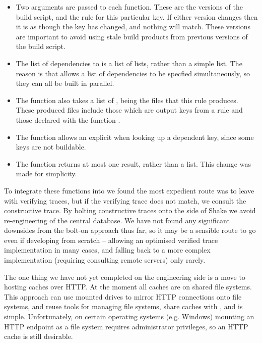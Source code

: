 \begin{itemize}
\item Two  arguments are passed to each function. These are
      the versions of the build script, and the rule for this particular key. If
      either version changes then it is as though the key has changed, and
      nothing will match. These versions are important to avoid using stale
      build products from previous versions of the build script.
\item The list of dependencies to  is a list of lists, rather than
      a simple list. The reason is that \Shake allows a list of dependencies to
      be specfied simultaneously, so they can all be built in parallel.
\item The  function also takes a list of , being the
      files that this rule produces. These produced files include those which
      are output keys from a rule and those declared with the function
      .
\item The  function allows an explicit  when looking
      up a dependent key, since some keys are not buildable.
\item The  function returns at most one result, rather than a
      list. This change was made for simplicity.
\end{itemize}

To integrate these functions into \Shake we found the most expedient route was
to leave \Shake with verifying traces, but if the verifying trace does not
match, we consult the constructive trace. By bolting constructive traces onto
the side of Shake we avoid re-engineering of the central database. We have not
found any significant downsides from the bolt-on approach thus far, so it may be
a sensible route to go even if developing from scratch -- allowing an optimised
verified trace implementation in many cases, and falling back to a more complex
implementation (requiring consulting remote servers) only rarely.

The one thing we have not yet completed on the engineering side is a move to
hosting caches over HTTP. At the moment all caches are on shared file systems.
This approach can use mounted drives to mirror HTTP connections onto file
systems, and reuse tools for managing file systems, share caches with
, and is simple. Unfortunately, on certain operating systems (e.g.
Windows) mounting an HTTP endpoint as a file system requires administrator
privileges, so an HTTP cache is still desirable.

